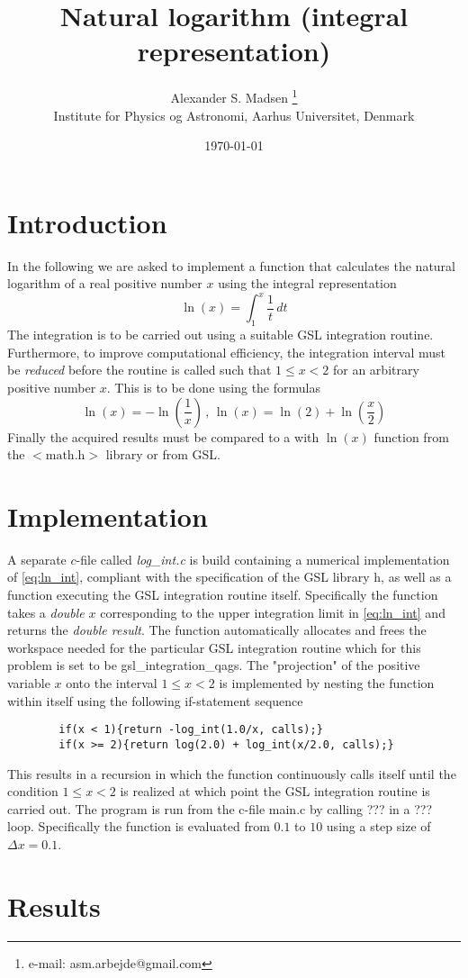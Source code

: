 \documentclass[a4paper,oneside,article,10pt]{memoir}
\title{\Huge Natural logarithm (integral representation)}
\author{Alexander S. Madsen \thanks{e-mail: asm.arbejde@gmail.com}\\
Institute for Physics og Astronomi, Aarhus Universitet, Denmark}
\date{\today} %
\numberwithin{equation}{section}
\begin{document}
\maketitle


\chapter{Introduction}
In the following we are asked to implement a function that calculates the natural logarithm of a real positive number $x$ using the integral representation
\begin{equation}
  \ln(x) = \int_1^x \frac{1}{t} \,dt\label{eq:ln_int}
\end{equation}
The integration is to be carried out using a suitable GSL integration routine. Furthermore, to improve computational efficiency, the integration interval must be \textit{reduced} before the routine is called such that $1\leq x < 2$ for an arbitrary positive number $x$. This is to be done using the formulas
\begin{equation}
  \ln(x) = -\ln\left(\frac{1}{x}\right)\, , \, \ln(x)=\ln(2)+\ln\left(\frac{x}{2}\right)
\end{equation}
Finally the acquired results must be compared to a with $\ln(x)$ function from the $<\text{math.h}>$ library or from GSL.

\chapter{Implementation}
 A separate $c$-file called \textit{log\_int.c} is build containing a numerical implementation of \cref{eq:ln_int}, compliant with the specification of the GSL library $\text{h}$, as well as a function executing the GSL integration routine itself. 
 Specifically the function takes a \textit{double} $x$ corresponding to the upper integration limit in \cref{eq:ln_int} and returns the \textit{double result}. The function automatically allocates and frees the workspace needed for the particular GSL integration routine which for this problem is set to be gsl\_integration\_qags. 
 The "projection" of the positive variable $x$ onto the interval $1\leq x < 2$ is implemented by nesting the function within itself using the following if-statement sequence 
 \begin{lstlisting}
 		if(x < 1){return -log_int(1.0/x, calls);}
 		if(x >= 2){return log(2.0) + log_int(x/2.0, calls);}
 \end{lstlisting}
This results in a recursion in which the function continuously calls itself until the condition $1\leq x < 2$ is realized at which point the GSL integration routine is carried out.
The program is run from the c-file main.c by calling ??? in a ??? loop. Specifically the function is evaluated from $0.1$ to $10$ using a step size of $\Delta x = 0.1$. 


\chapter{Results}
\end{document}
